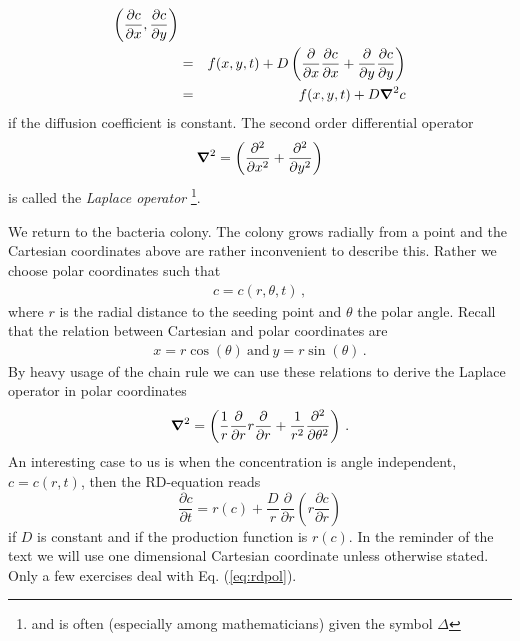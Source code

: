 \begin{example}
\begin{eqnarray}
		\left(\frac{\partial c}{\partial x}, \frac{\partial c}{\partial y}\right)
		\nonumber  \\
		&=& f(x,y,t) + D \left(\frac{\partial}{\partial x}\frac{\partial c}{\partial x}
		+ \frac{\partial}{\partial y}\frac{\partial c}{\partial y} \right) \nonumber \\
		&=& f(x,y,t) + D \boldsymbol{\nabla}^2 c
	\end{eqnarray}
	if the diffusion coefficient is constant. The second order differential operator 
	\begin{equation}
		\boldsymbol{\nabla}^2 =  
		\left(\frac{\partial^2}{\partial x^2} + \frac{\partial^2}{\partial y^2}
		\right)
	\end{equation}
	is called the \emph{Laplace operator}
	\footnote{and is often (especially among mathematicians) given the symbol $\Delta$}. 

	We return to the bacteria colony. The colony grows radially from a point and
	the Cartesian coordinates above are rather inconvenient to describe this. Rather
	we choose polar coordinates such that
	\begin{eqnarray}
		 c = c(r, \theta, t) \, ,
	\end{eqnarray}
	where $r$ is the radial distance to the seeding point and $\theta$ the polar
	angle. Recall that the relation between Cartesian and polar coordinates are
	\begin{eqnarray}
		x = r \cos(\theta) \ \text{and} \   y = r \sin(\theta) \, .
	\end{eqnarray}
	By heavy usage of the chain rule we can use these relations to derive the 
	Laplace operator in polar coordinates
	\begin{eqnarray}
		\boldsymbol{\nabla}^2 = \left(\frac{1}{r}\frac{\partial}{\partial r}
		r\frac{\partial }{\partial r}  +
		\frac{1}{r^2}\frac{\partial^2}{\partial \theta^2}\right) \, .
	\end{eqnarray}
	An interesting case to us is when the concentration is angle
	independent, $c= c(r,t)$, then the RD-equation reads 
	\begin{equation}
		\label{eq:rdpol}
		\frac{\partial c}{\partial t} = r(c) +
		\frac{D}{r}\frac{\partial}{\partial r}
		\left(  r\frac{\partial c}{\partial r} \right) 
	\end{equation}
	if $D$ is constant and if the production function is $r(c)$. In the reminder of the text we will 
	use one dimensional Cartesian coordinate unless otherwise stated. Only a few
	exercises deal with Eq. (\ref{eq:rdpol}).
\end{example}	

